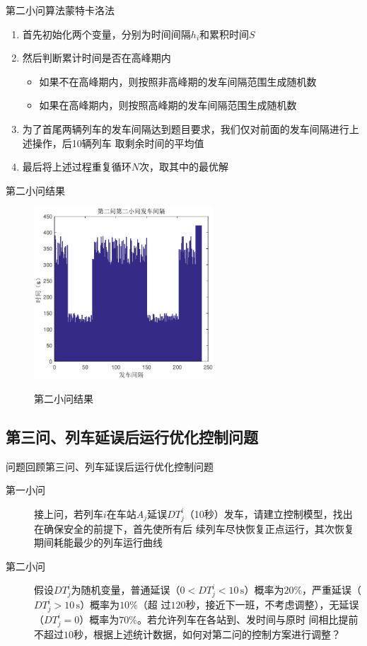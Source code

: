 \documentclass{beamer}
\begin{document}
\begin{frame}{第二小问算法}{蒙特卡洛法}
\begin{enumerate}
  \item<1-> 首先初始化两个变量，分别为时间间隔$h_i$和累积时间$S$
  \item<2-> 然后判断累计时间是否在高峰期内
  \begin{itemize}
    \item<3-> 如果不在高峰期内，则按照非高峰期的发车间隔范围生成随机数
    \item<4-> 如果在高峰期内，则按照高峰期的发车间隔范围生成随机数
  \end{itemize}

  \item<5-> 为了首尾两辆列车的发车间隔达到题目要求，我们仅对前面的发车间隔进行上述操作，后10辆列车
  取剩余时间的平均值
  \item<6-> 最后将上述过程重复循环$N$次，取其中的最优解
\end{enumerate}
\end{frame}

\begin{frame}{第二小问结果}
\begin{figure}
  \centering
  \includegraphics[width=6.7cm]{fig/fig14/fig14.pdf}\\
  \caption{第二小问结果}
\end{figure}

\end{frame}

\subsection{第三问、列车延误后运行优化控制问题}
\begin{frame}{问题回顾}{第三问、列车延误后运行优化控制问题}
\begin{description}
  \item[第一小问] 接上问，若列车$i$在车站$A_j$延误$DT_j^i$（10秒）发车，请建立控制模型，找出在确保安全的前提下，首先使所有后
续列车尽快恢复正点运行，其次恢复期间耗能最少的列车运行曲线
  \item[第二小问] 假设$DT_j^i$为随机变量，普通延误（$0<DT_j^i <10 \, \mathrm{s}$）概率为$20\%$，严重延误（$DT_j^i >10 \, \mathrm{s}$）概率为$10\%$（超
过$120$秒，接近下一班，不考虑调整），无延误（$DT_j^i= 0$）概率为$70\%$。若允许列车在各站到、发时间与原时
间相比提前不超过$10$秒，根据上述统计数据，如何对第二问的控制方案进行调整？
\end{description}
\end{frame}
\end{document}
